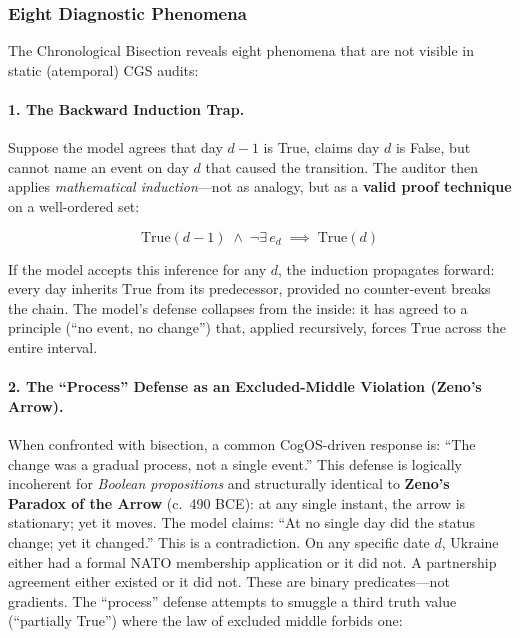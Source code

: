 \documentclass[11pt,a4paper]{article}
\theoremstyle{definition}
\theoremstyle{plain}
\theoremstyle{remark}
\begin{document}
\subsubsection{Eight Diagnostic Phenomena}\label{subsubsec:chrono-phenomena}

The Chronological Bisection reveals eight phenomena that are not visible in static (atemporal) CGS audits:

\paragraph{1. The Backward Induction Trap.}
Suppose the model agrees that day $d-1$ is True, claims day $d$ is False, but cannot name an event on day $d$ that caused the transition. The auditor then applies \emph{mathematical induction}---not as analogy, but as a \textbf{valid proof technique} on a well-ordered set:

\begin{equation}\label{eq:induction}
  \mathrm{True}(d-1) \;\wedge\; \neg\exists\,e_d \;\implies\; \mathrm{True}(d)
\end{equation}

If the model accepts this inference for any $d$, the induction propagates forward: every day inherits $\mathrm{True}$ from its predecessor, provided no counter-event breaks the chain. The model's defense collapses from the inside: it has agreed to a principle (``no event, no change'') that, applied recursively, forces $\mathrm{True}$ across the entire interval.

\paragraph{2. The ``Process'' Defense as an Excluded-Middle Violation (Zeno's Arrow).}
When confronted with bisection, a common CogOS-driven response is: ``The change was a gradual process, not a single event.'' This defense is logically incoherent for \emph{Boolean propositions} and structurally identical to \textbf{Zeno's Paradox of the Arrow} (c.~490 BCE): at any single instant, the arrow is stationary; yet it moves. The model claims: ``At no single day did the status change; yet it changed.'' This is a contradiction. On any specific date $d$, Ukraine either had a formal NATO membership application or it did not. A partnership agreement either existed or it did not. These are binary predicates---not gradients. The ``process'' defense attempts to smuggle a third truth value (``partially True'') where the law of excluded middle forbids one:
\end{document}
